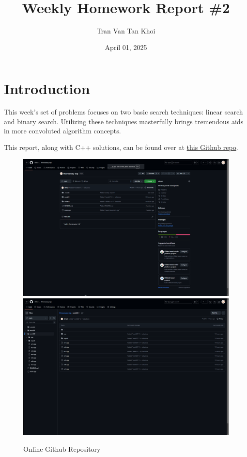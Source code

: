 \documentclass{article}
\author{Tran Van Tan Khoi}
\title{Weekly Homework Report \#2}
\date{April 01, 2025}
\begin{document}
    \maketitle

    \section{Introduction}
    
    This week's set of problems focuses on two basic search techniques: linear search and binary search. Utilizing these techniques masterfully brings tremendous aids in more convoluted algorithm concepts.


    This report, along with C++ solutions, can be found over at \href{https://github.com/xtrkoi/throwaway-rep}{this Github repo}.

    \begin{figure}[!h]
        \centering
        \includegraphics[width=12cm]{figure01.png}\hfil
        \includegraphics[width=12cm]{figure02.png}
        \caption{Online Github Repository}
    \end{figure}
\end{document}
